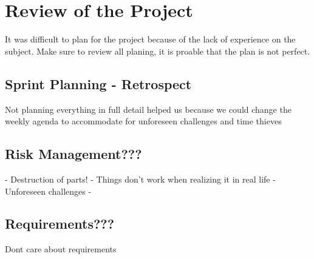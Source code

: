 \section{Review of the Project}

It was difficult to plan for the project because of the lack of experience on the subject. Make sure to review all planing, it is proable that the plan is not perfect.





\subsection{Sprint Planning - Retrospect}

Not planning everything in full detail helped us because we could change the weekly agenda to accommodate for unforeseen challenges and time thieves


\subsection{Risk Management???}

- Destruction of parts!
- Things don't work when realizing it in real life
- Unforeseen challenges
- 


\subsection{Requirements???}

Dont care about requirements
